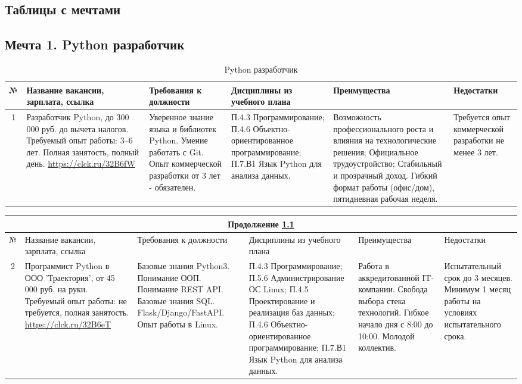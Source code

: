 \documentclass[14pt]{extreport}
\begin{document}
\begin{landscape}

\chapter{Таблицы с мечтами}

\section{Мечта 1. Python разработчик}
\begin{table}[H]
\caption{Python разработчик}
\label{tab_pydev}
	\begin{tabular}{|c|p{3.3cm}|p{6cm}|p{4.7cm}|p{5.5cm}|p{3.5cm}|}
	\hline № & {Название вакансии, зарплата, ссылка} & {Требования к должности} & {Дисциплины из учебного плана} & {Преимущества} & {Недостатки} \\
	\hline 1 & {Разработчик Python,
до 300 000 руб. до вычета налогов.
Требуемый опыт работы: 3–6 лет.
Полная занятость, полный день. \url{https://clck.ru/32B6fW}} & {Уверенное знание языка и библиотек Python.
Умение работать с Git.
Опыт коммерческой разработки от 3 лет - обязателен.} & {П.4.3 Программирование;
П.4.6 Объектно-ориентированное программирование;
П.7.В1 Язык Python для анализа данных.} & {Возможность профессионального роста и влияния на технологические решения;
Официальное трудоустройство;
Стабильный и прозрачный доход.
Гибкий формат работы (офис/дом), пятидневная рабочая неделя.} & {Требуется опыт коммерческой разработки не менее 3 лет.} \\
	\hline
	\end{tabular}
\end{table}

\begin{table}[H]
	\begin{tabular}{|c|p{3.3cm}|p{6cm}|p{4.7cm}|p{5.5cm}|p{3.5cm}|}
	\multicolumn{6}{c}{Продолжение \ref{tab_pydev}} \\
	\hline № & {Название вакансии, зарплата, ссылка} & {Требования к должности} & {Дисциплины из учебного плана} & {Преимущества} & {Недостатки} \\
 	\hline 2 & {Программист Python в ООО 'Траектория', от 45 000 руб. на руки. Требуемый опыт работы: не требуется, полная занятость. \url{https://clck.ru/32B6eT}} & {Базовые знания Python3. Понимание ООП. Понимание REST API. Базовые знания SQL. Flask/Django/FastAPI. Опыт работы в Linux.} & {П.4.3 Программирование;
П.5.6 Администрирование ОС Linux;
П.4.5 Проектирование и реализация баз данных;
П.4.6 Объектно-ориентированное программирование;
П.7.В1 Язык Python для анализа данных.} & {Работа в аккредитованной IT-компании.
Свобода выбора стека технологий.
Гибкое начало дня с 8:00 до 10:00.
Молодой коллектив.} & {Испытательный срок до 3 месяцев. Минимум 1 месяц работы на условиях испытательного срока.} \\
	\hline
	\end{tabular}
\end{table}


\end{landscape}
\end{document}
